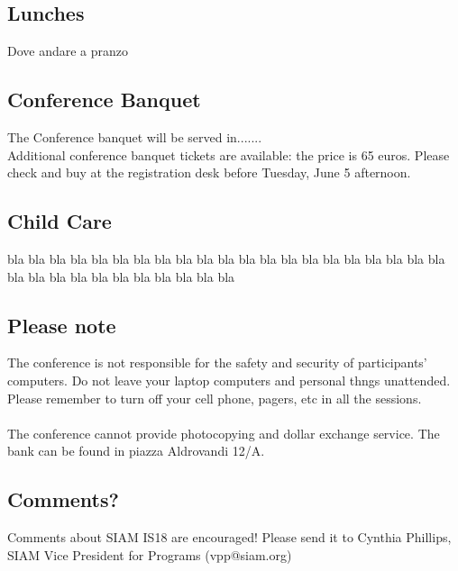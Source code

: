 \documentclass[10pt, a4paper]{book}
\begin{document}
\begin{multicols}{2}
\subsection*{Lunches}
Dove andare a pranzo
\subsection*{Conference Banquet}
The Conference banquet will be served in.......\\ Additional conference banquet tickets are available: the price is 65 euros. Please check and buy at the registration desk before Tuesday, June 5 afternoon.
\subsection*{Child Care}
bla bla bla bla bla bla bla bla bla bla bla bla bla bla bla bla bla bla bla bla bla bla bla bla bla bla bla bla bla bla bla bla
\subsection*{Please note}
The conference is not responsible for the safety and security of participants' computers. Do not leave your laptop computers and personal thngs unattended. Please remember to turn off your cell phone, pagers, etc in all the sessions.\\\\ The conference cannot provide photocopying and dollar exchange service. The bank can be found in piazza Aldrovandi 12/A.
\subsection*{Comments?}
Comments about SIAM IS18 are encouraged! Please send it to Cynthia Phillips, SIAM Vice President for Programs (vpp@siam.org)
\end{multicols}
\end{document}
